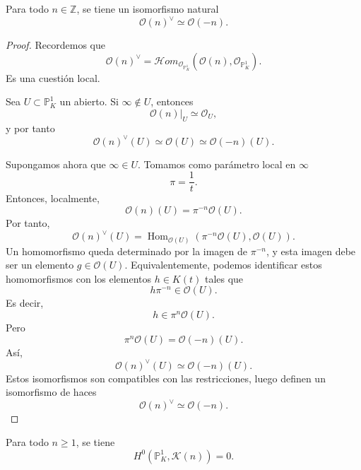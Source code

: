 \begin{lemma}
Para todo $n\in\mathbb{Z}$, se tiene un isomorfismo natural
\[
\mathcal{O}(n)^\vee\simeq \mathcal{O}(-n).
\]
\end{lemma}

\begin{proof}
Recordemos que
\[
\mathcal{O}(n)^\vee=
\mathcal{H}om_{\mathcal{O}_{\mathbb{P}^1_K}}(\mathcal{O}(n),\mathcal{O}_{\mathbb{P}^1_K}).
\]
Es una cuestión local.

Sea $U\subset \mathbb{P}^1_K$ un abierto. Si $\infty\notin U$, entonces
\[
\mathcal{O}(n)|_U\simeq \mathcal{O}_U,
\]
y por tanto
\[
\mathcal{O}(n)^\vee(U)
\simeq
\mathcal{O}(U)
\simeq
\mathcal{O}(-n)(U).
\]

Supongamos ahora que $\infty\in U$. Tomamos como parámetro local en $\infty$
\[
\pi=\frac{1}{t}.
\]
Entonces, localmente,
\[
\mathcal{O}(n)(U)=\pi^{-n}\mathcal{O}(U).
\]
Por tanto,
\[
\mathcal{O}(n)^\vee(U)=
\operatorname{Hom}_{\mathcal{O}(U)}
(\pi^{-n}\mathcal{O}(U),\mathcal{O}(U)).
\]
Un homomorfismo queda determinado por la imagen de $\pi^{-n}$, y esta imagen debe ser un elemento $g\in\mathcal{O}(U)$. Equivalentemente, podemos identificar estos homomorfismos con los elementos $h\in K(t)$ tales que
\[
h\pi^{-n}\in \mathcal{O}(U).
\]
Es decir,
\[
h\in \pi^n\mathcal{O}(U).
\]
Pero
\[
\pi^n\mathcal{O}(U)=\mathcal{O}(-n)(U).
\]
Así,
\[
\mathcal{O}(n)^\vee(U)\simeq \mathcal{O}(-n)(U).
\]
Estos isomorfismos son compatibles con las restricciones, luego definen un isomorfismo de haces
\[
\mathcal{O}(n)^\vee\simeq \mathcal{O}(-n).
\]
\end{proof}

\begin{lemma}
Para todo $n\ge 1$, se tiene
\[
H^0(\mathbb{P}^1_K,\mathcal{K}(n))=0.
\]
\end{lemma}

